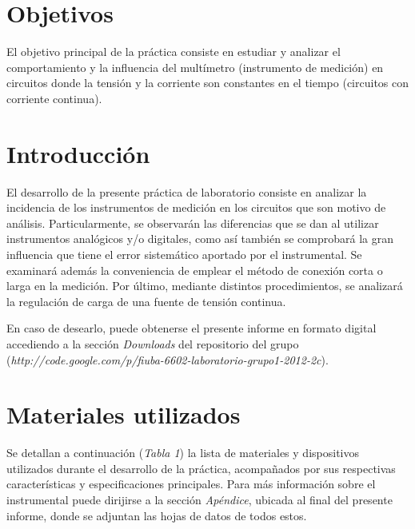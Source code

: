 \documentclass{article}
\begin{document}
\section{Objetivos}

	El objetivo principal de la práctica consiste en estudiar y analizar el comportamiento y la influencia del multímetro (instrumento de medición) en circuitos donde la tensión y la corriente son constantes en el tiempo (circuitos con corriente continua).  
\bigskip



\section{Introducción}

	El desarrollo de la presente práctica de laboratorio consiste en analizar la incidencia de los instrumentos de medición en los circuitos que son motivo de análisis. Particularmente, se observarán las diferencias que se dan al utilizar instrumentos analógicos y/o digitales, como así también se comprobará la gran influencia que tiene el error sistemático aportado por el instrumental. Se examinará además la conveniencia de emplear el método de conexión corta o larga en la medición. Por último, mediante distintos procedimientos, se analizará la regulación de carga de una fuente de tensión continua.
	\par
	En caso de desearlo, puede obtenerse el presente informe en formato digital accediendo a la sección \textit{Downloads} del repositorio del grupo (\textit{http://code.google.com/p/fiuba-6602-laboratorio-grupo1-2012-2c}).

\bigskip




\section{Materiales utilizados}

	Se detallan a continuación (\textit{Tabla 1}) la lista de materiales y dispositivos utilizados durante el desarrollo de la práctica, acompañados por sus respectivas características y especificaciones principales. Para más información sobre el instrumental puede dirijirse a la sección \textit{Apéndice}, ubicada al final del presente informe, donde se adjuntan las hojas de datos de todos estos.
\bigskip\bigskip
\end{document}
